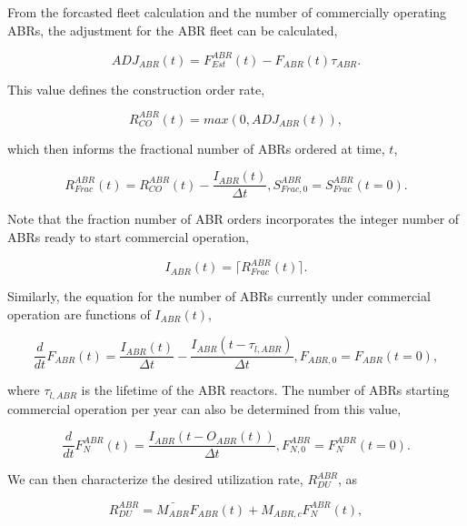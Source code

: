 From the forcasted fleet calculation and the number of commercially operating
ABRs, the adjustment for the ABR fleet can be calculated,

\begin{equation}
 ADJ_{ABR}(t) = {F_{Est}^{ABR}(t) - F_{ABR}(t)}{\tau_{ABR}}.
\end{equation}

This value defines the construction order rate,

\begin{equation}
 R_{CO}^{ABR}(t) = max \left( 0, ADJ_{ABR}(t) \right),
\end{equation}

which then informs the fractional number of ABRs ordered at time, $t$, 

\begin{equation}
 R^{ABR}_{Frac}(t) = R_{CO}^{ABR}(t) - \frac{I_{ABR}(t)}{\Delta t}, S^{ABR}_{Frac,0} = S^{ABR}_{Frac}(t=0).
\end{equation}

Note that the fraction number of ABR orders incorporates the integer number of
ABRs ready to start commercial operation,

\begin{equation}
 I_{ABR}(t) = \lceil R^{ABR}_{Frac}(t) \rceil.
\end{equation}

Similarly, the equation for the number of ABRs currently under commercial
operation are functions of $I_{ABR}(t)$,

\begin{equation}
 \frac{d}{dt} F_{ABR}(t) = \frac{I_{ABR}(t)}{\Delta t} - \frac{I_{ABR}(t-\tau_{l,ABR})}{\Delta t}, F_{ABR,0} = F_{ABR}(t=0),
\end{equation}

where $\tau_{l,ABR}$ is the lifetime of the ABR reactors. The number of ABRs
starting commercial operation per year can also be determined from this value,

\begin{equation}
 \frac{d}{dt} F_N^{ABR}(t) = \frac{I_{ABR}(t - O_{ABR}(t))}{\Delta t}, F^{ABR}_{N,0} = F^{ABR}_{N}(t=0).
\end{equation}

We can then characterize the desired utilization rate, $R^{ABR}_{DU}$, as

\begin{equation}
 R^{ABR}_{DU} = \bar{M_{ABR}} F_{ABR}(t) + M_{ABR,c} F_N^{ABR}(t),
\end{equation}

